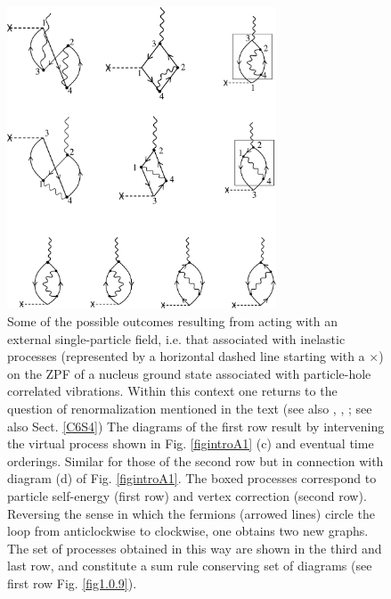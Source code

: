 \begin{figure}
\centerline {
\includegraphics*[width=8cm]{introduccion/figs/fig1_7_2}
}
\caption[External field acting on ZPF.]{ Some of the possible outcomes resulting from acting with an external single-particle field, i.e. that associated with inelastic processes (represented by a horizontal dashed line starting with a $\times$) on the ZPF of a nucleus ground state associated with particle-hole correlated vibrations. Within this context one returns to the question of  renormalization mentioned in the text (see also \cite{Idini:15}, \cite{Broglia:16}, \cite{Barranco:17}; see also Sect. \ref{C6S4}) The diagrams of the first row result by intervening the virtual process shown in Fig. \ref{figintroA1} (c) and eventual time orderings. Similar for those of the second row but in connection with diagram (d) of Fig. \ref{figintroA1}. The boxed processes correspond to particle self-energy (first row) and vertex correction (second row). Reversing the sense in which the fermions (arrowed lines) circle the loop from anticlockwise to clockwise, one obtains two new graphs. The  set of processes obtained in this way are shown in the third and last row, and constitute a sum rule conserving set of diagrams (see first row Fig. \ref{fig1.0.9}).}
\label{figintroA2}
\end{figure}


